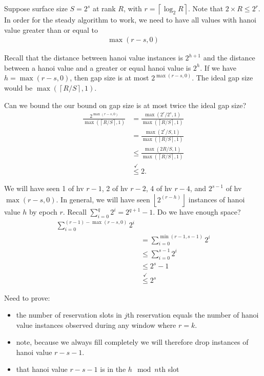 Suppose surface size $S = 2^s$ at rank $R$, with $r = \left\lceil \log_2 R \right\rceil$.
Note that $2 \times R \leq 2^r$.
In order for the steady algorithm to work, we need to have all values with hanoi value greater than or equal to
\begin{align*}
\max(r - s, 0)
\end{align*}

Recall that the distance between hanoi value instances is $2^{h + 1}$ and the distance between a hanoi value and a greater or equal hanoi value is $2^h$.
If we have $h = \max (r - s, 0)$, then gap size is at most $2^{\max(r - s, 0)}$.
The ideal gap size would be $\max( \left\lceil R / S \right\rceil, 1)$.

Can we bound the our bound on gap size is at most twice the ideal gap size?
\begin{align*}
\frac{
  2^{\max(r - s, 0)}
}{
  \max(\left\lceil R / S \right\rceil, 1)
}
&=
\frac{
  \max(2^r / 2^s, 1)
}{
  \max(\left\lceil R / S \right\rceil, 1)
} \\
&=
\frac{
  \max(2^r / S, 1)
}{
  \max(\left\lceil R / S \right\rceil, 1)
} \\
&\leq
\frac{
  \max(2R / S, 1)
}{
  \max(\left\lceil R / S \right\rceil, 1)
} \\
&\stackrel{\checkmark}{\leq} 2.
\end{align*}

We will have seen 1 of hv $r - 1$, 2 of hv $r - 2$, 4 of hv $r - 4$, and $2 ^ {s - 1}$ of hv $\max(r - s, 0)$.
In general, we will have seen $\left\lfloor 2 ^ (r - h) \right\rfloor$ instances of hanoi value $h$ by epoch $r$.
Recall $\sum_{i = 0}^{q} 2^i = 2 ^ {q + 1} - 1$.
Do we have enough space?
\begin{align*}
\sum_{i = 0}^{(r - 1) - \max(r - s, 0)} 2 ^ i \\
&= \sum_{i = 0}^{\min(r - 1, s - 1)} 2 ^ i \\
&\leq \sum_{i = 0}^{s - 1} 2 ^ i \\
&\leq 2^s - 1\\
&\stackrel{\checkmark}{\leq} 2^s
\end{align*}

Need to prove:
\begin{itemize}
\item the number of reservation slots in $j$th reservation equals the number of hanoi value instances observed during any window where $r = k$.
\item note, because we always fill completely we will therefore drop instances of hanoi value $r - s - 1$.
\item that hanoi value $r - s - 1$ is in the $h \mod n$th slot
\end{itemize}

